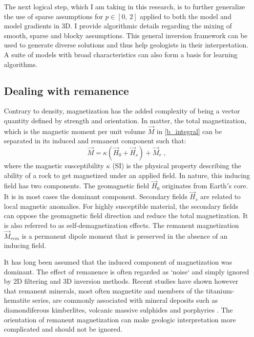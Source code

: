The next logical step, which I am taking in this research, is to further generalize the use of sparse assumptions for $p \in[0,\:2]$ applied to both the model and model gradients in 3D. I provide algorithmic details regarding the mixing of smooth, sparse and blocky assumptions. This general inversion framework can be used to generate diverse solutions and thus help geologists in their interpretation. A suite of models with broad characteristics can also form a basis for learning algorithms.

\subsection{Dealing with remanence}
Contrary to density, magnetization has the added complexity of being a vector quantity defined by strength and orientation.
In matter, the total magnetization, which is the magnetic moment per unit volume $\vec{M}$ in \eqref{b_integral} can be separated in its induced and remanent component such that:
\begin{equation}\label{Magnetization}
	\vec{M} = \kappa (\vec{H}_0 + \vec{H}_s) + \vec{M}_{r}\;,
\end{equation}
where the magnetic susceptibility $\kappa$ (SI) is the physical property describing the ability of a rock to get magnetized under an applied field. In nature, this inducing field has two components. The geomagnetic field $\vec{H}_0$ originates from Earth$'$s core. It is in most cases the dominant component. Secondary fields $\vec{H}_s$ are related to local magnetic anomalies. For highly susceptible material, the secondary fields can oppose the geomagnetic field direction and reduce the total magnetization. It is also referred to as self-demagnetization effects.
The remanent magnetization $\vec{M}_{rem}$ is a permanent dipole moment that is preserved in the absence of an inducing field.

It has long been assumed that the induced component of magnetization was dominant. The effect of remanence is often regarded as `noise` and simply ignored by 2D filtering and 3D inversion methods. Recent studies have shown however that remanent minerals, most often magnetite and members of the titanium-hematite series, are commonly associated with mineral deposits such as diamondiferous kimberlites, volcanic massive sulphides and porphyries \cite[]{Henkel1991, Enkin2014}. The orientation of remanent magnetization can make geologic interpretation more complicated and should not be ignored.

